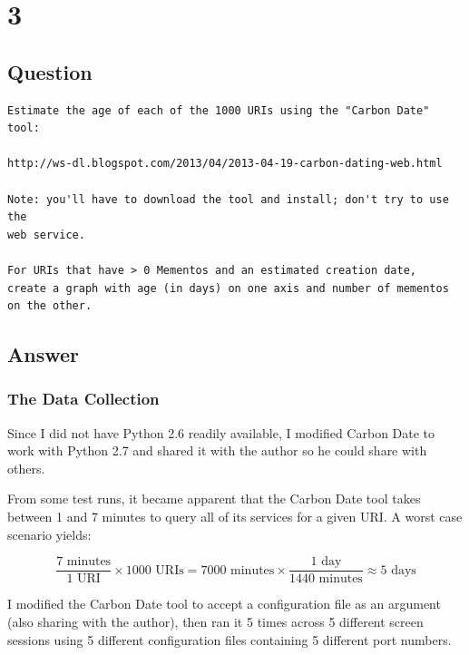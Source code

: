 \documentclass[letterpaper,11pt]{article}
\begin{document}
\newpage



\newpage
\section*{3}

\subsection*{Question}

\begin{verbatim}
Estimate the age of each of the 1000 URIs using the "Carbon Date" tool:

http://ws-dl.blogspot.com/2013/04/2013-04-19-carbon-dating-web.html

Note: you'll have to download the tool and install; don't try to use the 
web service.  

For URIs that have > 0 Mementos and an estimated creation date,
create a graph with age (in days) on one axis and number of mementos
on the other.
\end{verbatim}

\newpage
\subsection*{Answer}

\subsubsection*{The Data Collection}
Since I did not have Python 2.6 readily available, I modified Carbon Date to work with Python 2.7 and shared it with the author so he could share with others.

From some test runs, it became apparent that the Carbon Date tool takes between 1 and 7 minutes to query all of its services for a given URI.  A worst case scenario yields:

\[
\frac{7 \textrm{ minutes}}{1 \textrm{ URI}} \times {1000 \textrm{ URIs}} = {7000 \textrm{ minutes}} \times \frac{1 \textrm{ day}}{1440 \textrm{ minutes}} \approx {5 \textrm{ days}}
\]

I modified the Carbon Date tool to accept a configuration file as an argument (also sharing with the author), then ran it 5 times across 5 different screen sessions using 5 different configuration files containing 5 different port numbers.
\end{document}
